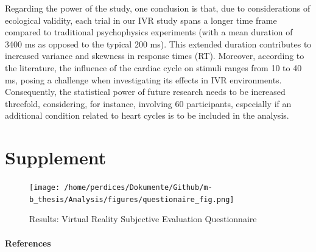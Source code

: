 \documentclass[12pt,oneside,openright]{report}
\begin{document}
Regarding the power of the study, one conclusion is that, due to considerations of ecological validity, each trial in our IVR study spans a longer time frame compared to traditional psychophysics experiments (with a mean duration of 3400 ms as opposed to the typical 200 ms). This extended duration contributes to increased variance and skewness in response times (RT). Moreover, according to the literature, the influence of the cardiac cycle on stimuli ranges from 10 to 40 ms, posing a challenge when investigating its effects in IVR environments. Consequently, the statistical power of future research needs to be increased threefold, considering, for instance, involving 60 participants, especially if an additional condition related to heart cycles is to be included in the analysis.






\newpage
\section*{Supplement}
    \begin{figure}[H]
        \centering
        \texttt{[image: /home/perdices/Dokumente/Github/m-b\_thesis/Analysis/figures/questionaire\_fig.png]}
        \caption{Results: Virtual Reality Subjective Evaluation Questionnaire}
        \label{fig:quest}
    \end{figure}
\pagebreak


\paragraph{\textbf{References}}
\printbibliography[heading=none]
\end{document}

